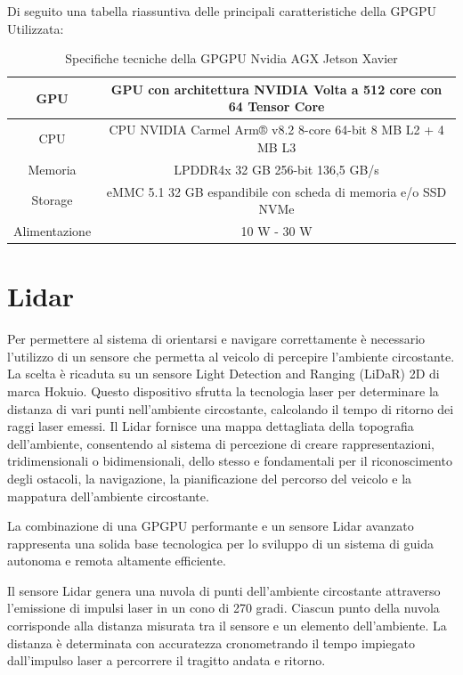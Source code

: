 \noindent Di seguito una tabella riassuntiva delle principali caratteristiche della GPGPU Utilizzata:

\begin{center}
  \begin{table}[h]
  \centering
    \begin{tabular}{|c|c|}
      \hline 
      GPU& GPU con architettura NVIDIA Volta a 512 core con 64 Tensor Core \\
      \hline 
      CPU& CPU NVIDIA Carmel Arm® v8.2 8-core 64-bit 8 MB L2 + 4 MB L3 \\
      \hline 
      Memoria& LPDDR4x 32 GB 256-bit 136,5 GB/s \\
      \hline
      Storage& eMMC 5.1 32 GB espandibile con scheda di memoria e/o SSD NVMe \\ 
      \hline
      Alimentazione& 10 W - 30 W \\
      \hline
    \end{tabular}
    \caption{Specifiche tecniche della GPGPU Nvidia AGX Jetson Xavier\cite{jetson_xavier}}
  \end{table}
\end{center}

\section{Lidar}
Per permettere al sistema di orientarsi e navigare correttamente è necessario l'utilizzo di un sensore che permetta al veicolo di percepire l'ambiente circostante. La scelta è ricaduta su un sensore Light Detection and Ranging (LiDaR) 2D di marca Hokuio. Questo dispositivo sfrutta la tecnologia laser per determinare la distanza di vari punti nell'ambiente circostante, calcolando il tempo di ritorno dei raggi laser emessi. Il Lidar fornisce una mappa dettagliata della topografia dell'ambiente, consentendo al sistema di percezione di creare rappresentazioni, tridimensionali o bidimensionali, dello stesso e fondamentali per il riconoscimento degli ostacoli, la navigazione, la pianificazione del percorso del veicolo e la mappatura dell'ambiente circostante.

\noindent La combinazione di una GPGPU performante e un sensore Lidar avanzato rappresenta una solida base tecnologica per lo sviluppo di un sistema di guida autonoma e remota altamente efficiente.

\noindent Il sensore Lidar genera una nuvola di punti dell'ambiente circostante attraverso l'emissione di impulsi laser in un cono di 270 gradi. Ciascun punto della nuvola corrisponde alla distanza misurata tra il sensore e un elemento dell'ambiente. La distanza è determinata con accuratezza cronometrando il tempo impiegato dall'impulso laser a percorrere il tragitto andata e ritorno.

